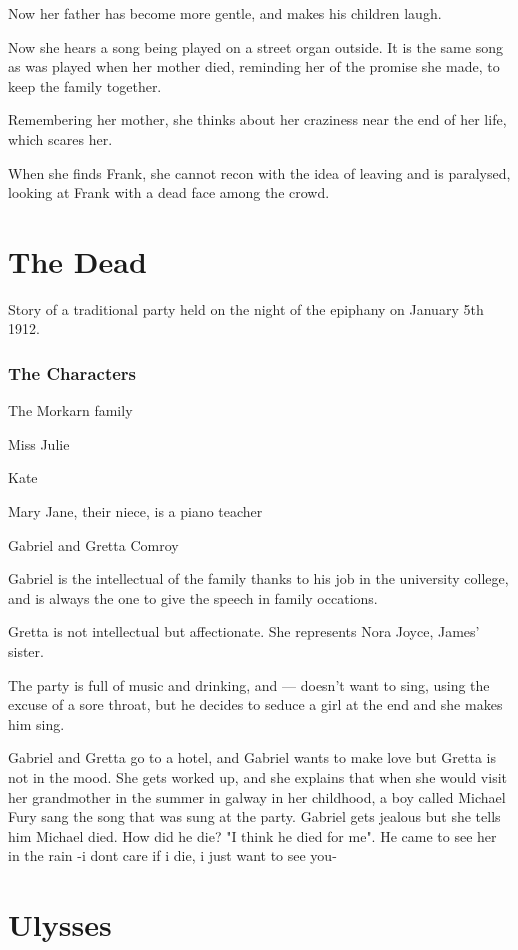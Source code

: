 \documentclass{article}
\begin{document}
Now her father has become more gentle, and makes his children laugh.

Now she hears a song being played on a street organ outside. It is the same song as was played when her mother died, reminding her of the promise she made, to keep the family together.

Remembering her mother, she thinks about her craziness near the end of her life, which scares her.

When she finds Frank, she cannot recon with the idea of leaving and is paralysed, looking at Frank with a dead face among the crowd.
\section{The Dead}
Story of a traditional party held on the night of the epiphany on January 5th 1912.
\subsubsection{The Characters}
The Morkarn family

Miss Julie

Kate

Mary Jane, their niece, is a piano teacher

Gabriel and Gretta Comroy

Gabriel is the intellectual of the family thanks to his job in the university college, and is always the one to give the speech in family occations.

Gretta is not intellectual but affectionate. She represents Nora Joyce, James' sister.

The party is full of music and drinking, and --- doesn't want to sing, using the excuse of a sore throat, but he decides to seduce a girl at the end and she makes him sing.

Gabriel and Gretta go to a hotel, and Gabriel wants to make love but Gretta is not in the mood. She gets worked up, and she explains that when she would visit her grandmother in the summer in galway in her childhood, a boy called Michael Fury sang the song that was sung at the party. Gabriel gets jealous but she tells him Michael died. How did he die? "I think he died for me". He came to see her in the rain -i dont care if i die, i just want to see you-
\section{Ulysses}
\end{document}
